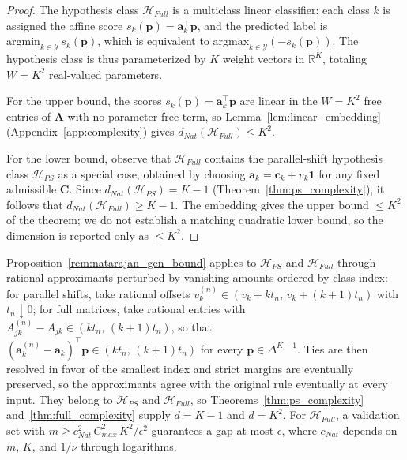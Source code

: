 \begin{proof}
    The hypothesis class $\mathcal{H}_{Full}$ is a multiclass linear classifier: each class $k$ is assigned the affine score $s_k(\mathbf{p}) = \mathbf{a}_k^\top \mathbf{p}$, and the predicted label is $\mathrm{argmin}_{k \in \mathcal{Y}}\, s_k(\mathbf{p})$, which is equivalent to $\mathrm{argmax}_{k \in \mathcal{Y}}(-s_k(\mathbf{p}))$. The hypothesis class is thus parameterized by $K$ weight vectors in $\mathbb{R}^K$, totaling $W = K^2$ real-valued parameters.

    For the upper bound, the scores $s_k(\mathbf{p}) = \mathbf{a}_k^\top \mathbf{p}$ are linear in the $W = K^2$ free entries of $\mathbf{A}$ with no parameter-free term, so Lemma~\ref{lem:linear_embedding} (Appendix~\ref{app:complexity}) gives $d_{Nat}(\mathcal{H}_{Full}) \leq K^2$.

    For the lower bound, observe that $\mathcal{H}_{Full}$ contains the parallel-shift hypothesis class $\mathcal{H}_{PS}$ as a special case, obtained by choosing $\mathbf{a}_k = \mathbf{c}_k + v_k \mathbf{1}$ for any fixed admissible $\mathbf{C}$. Since $d_{Nat}(\mathcal{H}_{PS}) = K - 1$ (Theorem~\ref{thm:ps_complexity}), it follows that $d_{Nat}(\mathcal{H}_{Full}) \geq K - 1$. The embedding gives the upper bound $\leq K^2$ of the theorem; we do not establish a matching quadratic lower bound, so the dimension is reported only as $\leq K^2$.
\end{proof}

Proposition~\ref{rem:natarajan_gen_bound} applies to $\mathcal{H}_{PS}$ and $\mathcal{H}_{Full}$ through rational approximants perturbed by vanishing amounts ordered by class index: for parallel shifts, take rational offsets $v_k^{(n)} \in (v_k + k t_n,\, v_k + (k+1) t_n)$ with $t_n \downarrow 0$; for full matrices, take rational entries with $A^{(n)}_{jk} - A_{jk} \in (k t_n,\, (k+1) t_n)$, so that $(\mathbf{a}_k^{(n)} - \mathbf{a}_k)^\top \mathbf{p} \in (k t_n,\, (k+1) t_n)$ for every $\mathbf{p} \in \Delta^{K-1}$. Ties are then resolved in favor of the smallest index and strict margins are eventually preserved, so the approximants agree with the original rule eventually at every input. They belong to $\mathcal{H}_{PS}$ and $\mathcal{H}_{Full}$, so Theorems~\ref{thm:ps_complexity} and~\ref{thm:full_complexity} supply $d = K-1$ and $d = K^2$. For $\mathcal{H}_{Full}$, a validation set with $m \geq c_{Nat}^2\, C_{max}^2\, K^2/\epsilon^2$ guarantees a gap at most $\epsilon$, where $c_{Nat}$ depends on $m$, $K$, and $1/\nu$ through logarithms.

